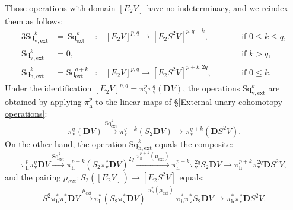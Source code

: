 \documentclass[11pt]{amsart} \renewcommand{\baselinestretch}{1.2}
\theoremstyle{plain}
\numberwithin{equation}{section} %
\theoremstyle{plain}
\numberwithin{equation}{chapter} %
\renewcommand{\to}{\longrightarrow}
\newcommand{\ExtCohOp}{\mathrm{Sq}_\mathrm{ext}}
\newcommand{\vExtCohOp}{\mathrm{Sq}_\mathrm{v,ext}}
\newcommand{\hExtCohOp}{\mathrm{Sq}_\mathrm{h,ext}}
\newcommand{\ExtCohProd}{\mu_\mathrm{ext}}
\newcommand{\Edown}[4]{[E_{#1}#2]^{#3}_{#4}}
\newcommand{\dver}{_\mathrm{v}}
\newcommand{\dhor}{_\mathrm{h}}
\newcommand{\dual}{\mathbf{D}}
\begin{document}
\begin{Operations in composite functor spectral sequences}
Those operations with domain $\Edown{2}{V}{}{}$ have no indeterminacy, and we reindex them as follows: %
\begin{alignat*}{3}
\vExtCohOp^k&=\,\ExtCohOp^k&:\,&\Edown{2}{V}{p,q}{}\to \Edown{2}{S^2V}{p,q+k}{},&\qquad&\text{if }0\leq k \leq q,\\
\vExtCohOp^k&=0,&&&&\text{if }k > q,\\
\hExtCohOp^k&=\ExtCohOp^{q+k}&:\,&\Edown{2}{V}{p,q}{}\to \Edown{2}{S^2V}{p+k,2q}{},&\qquad&\text{if }0\leq k.
\end{alignat*}
Under the identification $\Edown{2}{V}{p,q}{}=\pi\dhor^{p}\pi\dver^{q}(\dual V)$, the operations $\vExtCohOp^k$ %
are  obtained by applying $\pi\dhor^p$ to the linear maps of \S\ref{External unary cohomotopy operations}:
\[\pi\dver^{q}(\dual V)\overset{\ExtCohOp^k}{\to} \pi\dver^{q+k}(S_2\dual V)\to \pi\dver^{q+k}(\dual S^2V).\]
On the other hand, the operation $\hExtCohOp^k$ equals the composite:
\[\pi\dhor^p\pi\dver^q\dual V
\overset{\ExtCohOp^k}{\to} 
\pi\dhor^{p+k}(S_2\pi\dver^*\dual V)^{2q}
\overset{\pi\dhor^{p+k}(\ExtCohProd)}{\to}
\pi\dhor^{p+k}\pi\dver^{2q}S_2\dual V
\to 
\pi\dhor^{p+k}\pi\dver^{2q}\dual S^2 V,
\]
 and the pairing $\ExtCohProd:S_2(\Edown{2}{V}{}{})\to \Edown{2}{S^2V}{}{}$ equals:
\[S^2\pi\dhor^*\pi\dver^*\dual V
\overset{\ExtCohProd}{\to} 
\pi\dhor^*(S_2\pi\dver^*\dual V)
\overset{\pi\dhor^{*}(\ExtCohProd)}{\to}
\pi\dhor^{*}\pi\dver^{*}S_2\dual V
\to 
\pi\dhor^{*}\pi\dver^{*}\dual S^2 V.
\]


\end{Operations in composite functor spectral sequences}
\end{document}

